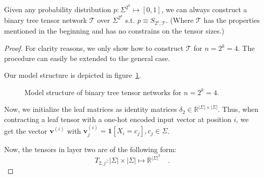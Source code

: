 \documentclass[../../main.tex]{subfiles}
\begin{document}
    \begin{proposition}
        Given any probability distribution $p: \Sigma^{2^k} \mapsto [0,1]$, we can always construct a binary tree tensor network $\mathcal{T}$ over $\Sigma^{2^k}$ s.t. $p \equiv S_{2^k, \mathcal{T}}$. (Where $\mathcal{T}$ has the properties mentioned in the beginning and has no constrains on the tensor sizes.)
    \end{proposition}
    \vspace{-2.5em}
    \begin{proof}
        For clarity reasons, we only show how to construct $\mathcal{T}$ for $n = 2^k = 4$. The procedure can easily be extended to the general case.

        Our model structure is depicted in figure~\ref{fig:binary_tree_tensor_network_n_equals_four}.

        \begin{figure}[h]
        \centering
        \caption{Model structure of binary tree tensor networks for $n = 2^k = 4$.}
        \label{fig:binary_tree_tensor_network_n_equals_four}
    \end{figure}

    Now, we initialize the leaf matrices as identity matrices $\delta_2 \in \mathbb{R}^{|\Sigma| \times |\Sigma|}$. Thus, when contracting a leaf tensor with a one-hot encoded input vector at position $i$, we get the vector $\bm{v}^{(i)}$ with $\bm{v}^{(i)}_j = \bm{1}[X_i = c_j], c_j \in \Sigma$.

    Now, the tensors in layer two are of the following form:
    \[
    T_{2, j}: |\Sigma| \times |\Sigma| \mapsto \mathbb{R}^{|\Sigma|^2} \quad .
    \]


\end{proof}
\end{document}
